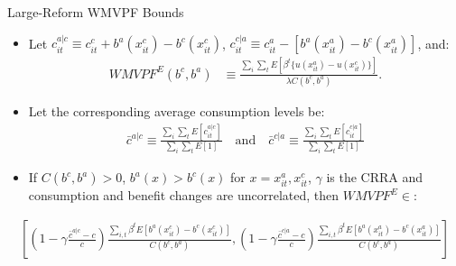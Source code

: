 \begin{frame}[label=boundsSummary]{Large-Reform WMVPF Bounds}
    \begin{itemize}
        \item Let $c^{a|c}_{it}\equiv c^c_{it}+b^a(x^c_{it})-b^c(x^c_{it})$, $c^{c|a}_{it}\equiv c^a_{it}-[b^a(x^a_{it})-b^c(x^a_{it})]$, and:
        \begin{align*}
            WMVPF^E(b^c,b^a)
            &\equiv
            \frac{\sum_i\sum_t E\left[\beta^t\{u(x^a_{it})-u(x^c_{it})\}\right]}
            {\lambda C(b^c,b^a)}.
        \end{align*}
        \item Let the corresponding average consumption levels be:
        \begin{align*}
            \bar c^{a|c}\equiv
        \frac{\sum_i\sum_t E[c^{a|c}_{it}]}{\sum_i\sum_t E[1]} \quad \text{and} \quad \bar c^{c|a} \equiv
        \frac{\sum_i\sum_t E[c^{c|a}_{it}]}{\sum_i\sum_t E[1]} 
        \end{align*}
        \item If $C(b^c,b^a)>0$, $b^a(x)>b^c(x)$ for  $x=x^a_{it},x^c_{it}$, $\gamma$ is the CRRA and consumption and benefit changes are uncorrelated, then $WMVPF^E \in$:
    \end{itemize}
    \footnotesize
        \begin{align*}
            \left[\left(1-\gamma\frac{\bar c^{a|c}-c}{c}\right)
            \frac{\sum\limits_{i,t} \beta^tE\left[b^a(x^c_{it})-b^c(x^c_{it})\right]}
            {C(b^c,b^a)}
            ,
            \left(1-\gamma\frac{\bar c^{c|a}-c}{c}\right)
            \frac{\sum\limits_{i,t} \beta^tE\left[b^a(x^a_{it})-b^c(x^a_{it})\right]}
            {C(b^c,b^a)}\right]
        \end{align*}
\end{frame}

